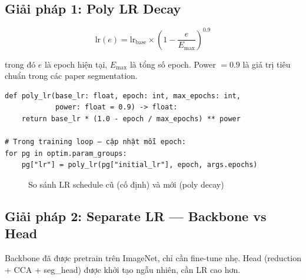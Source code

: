 \documentclass[12pt,a4paper]{article}
\begin{document}
\subsection{Giải pháp 1: Poly LR Decay}

\[
  \text{lr}(e) = \text{lr}_\text{base} \times \left(1 - \frac{e}{E_\text{max}}\right)^{0.9}
\]

trong đó $e$ là epoch hiện tại, $E_\text{max}$ là tổng số epoch. Power $= 0.9$ là
giá trị tiêu chuẩn trong các paper segmentation.

\begin{lstlisting}[caption={Poly LR decay}]
def poly_lr(base_lr: float, epoch: int, max_epochs: int,
            power: float = 0.9) -> float:
    return base_lr * (1.0 - epoch / max_epochs) ** power

# Trong training loop — cập nhật mỗi epoch:
for pg in optim.param_groups:
    pg["lr"] = poly_lr(pg["initial_lr"], epoch, args.epochs)
\end{lstlisting}

\begin{figure}[H]
  \centering
  \caption{So sánh LR schedule cũ (cố định) và mới (poly decay)}
\end{figure}

\subsection{Giải pháp 2: Separate LR — Backbone vs Head}

Backbone đã được pretrain trên ImageNet, chỉ cần fine-tune nhẹ.
Head (reduction + CCA + seg\_head) được khởi tạo ngẫu nhiên, cần LR cao hơn.
\end{document}
